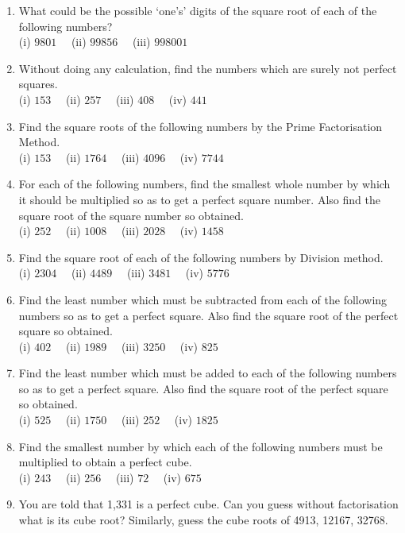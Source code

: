 \documentclass[a4paper,leqno,12pt]{amsart}
\begin{document}
\begin{enumerate}
\item What could be the possible ‘one’s’ digits of the square root of each of the following
numbers? \\
(i) $9801 \quad$ (ii) $99856 \quad$ (iii) $998001$

\item Without doing any calculation, find the numbers which are surely not perfect squares.\\
(i) $153 \quad$ (ii) $257 \quad$ (iii) $408 \quad$ (iv) $441$

\item Find the square roots of the following numbers by the Prime Factorisation Method.\\
(i) $153 \quad$ (ii) $1764 \quad$ (iii) $4096 \quad$ (iv) $7744$

\item For each of the following numbers, find the smallest whole number by which it should
be multiplied so as to get a perfect square number. Also find the square root of the
square number so obtained.\\
(i) $252 \quad$ (ii) $1008 \quad$ (iii) $2028 \quad$ (iv) $1458$

\item Find the square root of each of the following numbers by Division method.\\
(i) $2304 \quad$ (ii) $4489 \quad$ (iii) $3481 \quad$ (iv) $5776$

\item Find the least number which must be subtracted from each of the following numbers
so as to get a perfect square. Also find the square root of the perfect square so
obtained.\\
(i) $402 \quad$ (ii) $1989 \quad$ (iii) $3250 \quad$ (iv) $825$

\item Find the least number which must be added to each of the following numbers so as
to get a perfect square. Also find the square root of the perfect square so obtained.\\
(i) $525 \quad$ (ii) $1750 \quad$ (iii) $252 \quad$ (iv) $1825$

\item Find the smallest number by which each of the following numbers must be multiplied
to obtain a perfect cube.\\
(i) $243 \quad$ (ii) $256 \quad$ (iii) $72 \quad$ (iv) $675$

\item You are told that 1,331 is a perfect cube. Can you guess without factorisation what
is its cube root? Similarly, guess the cube roots of 4913, 12167, 32768.


\end{enumerate}
\end{document}
